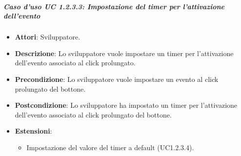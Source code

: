 \subparagraph{Caso d'uso UC 1.2.3.3: Impostazione del timer per l'attivazione dell'evento}

\FloatBarrier
\begin{itemize}
\item\textbf{Attori}: Sviluppatore.
\item\textbf{Descrizione}: Lo sviluppatore vuole impostare un timer per l'attivazione dell'evento associato al click prolungato.
\item\textbf{Precondizione}: Lo sviluppatore vuole impostare un evento al click prolungato del bottone.
\item\textbf{Postcondizione}: Lo sviluppatore ha impostato un timer per l'attivazione dell'evento associato al click prolungato del bottone.
\item \textbf{Estensioni}: 
\begin{itemize}
\item Impostazione del valore del timer a default (UC1.2.3.4).
\end{itemize}
\end{itemize}
